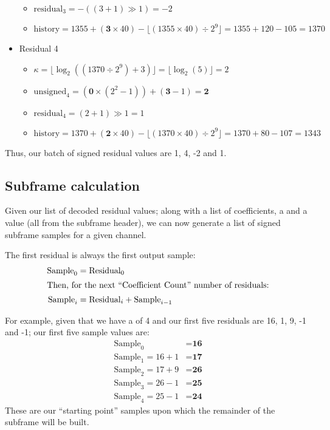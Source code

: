 \begin{itemize}
\begin{itemize}
\item $\text{residual}_3 = -((3 + 1) \gg 1) = -2$
\item $\text{history} = 1355 + (\textbf{3} \times 40) - \lfloor(1355 \times 40) \div 2^9\rfloor = 1355 + 120 - 105 = 1370$
\end{itemize}
\item Residual 4
\begin{itemize}
\item $\kappa = \lfloor\log_2((1370 \div 2^9) + 3)\rfloor = \lfloor\log_2(5)\rfloor = 2$
\item $\text{unsigned}_4 = (\textbf{0} \times (2^2 - 1)) + (\textbf{3} - 1) = \textbf{2}$
\item $\text{residual}_4 = (2 + 1) \gg 1 = 1$
\item $\text{history} = 1370 + (\textbf{2} \times 40) - \lfloor(1370 \times 40) \div 2^9\rfloor = 1370 + 80 - 107 = 1343$
\end{itemize}
\end{itemize}
Thus, our batch of signed residual values are 1, 4, -2 and 1.

\clearpage

\subsection{Subframe calculation}


Given our list of decoded residual values;
along with a list of coefficients,
a  and a  value
(all from the subframe header),
we can now generate a list of signed subframe samples for a
given channel.

The first residual is always the first output sample:
\begin{align*}
\text{Sample}_0 &= \text{Residual}_0 \\
\intertext{Then, for the next ``{Coefficient Count}'' number of residuals:}
\text{Sample}_i &= \text{Residual}_i + \text{Sample}_{i - 1}
\end{align*}

For example, given that we have a  of 4
and our first five residuals are 16, 1, 9, -1 and -1;
our first five sample values are:
\begin{align*}
\text{Sample}_0 &= \textbf{16} \\
\text{Sample}_1 = 16 + 1 &= \textbf{17} \\
\text{Sample}_2 = 17 + 9 &= \textbf{26} \\
\text{Sample}_3 = 26 - 1 &= \textbf{25} \\
\text{Sample}_4 = 25 - 1 &= \textbf{24}
\end{align*}
These are our ``starting point'' samples upon which the remainder
of the subframe will be built.

